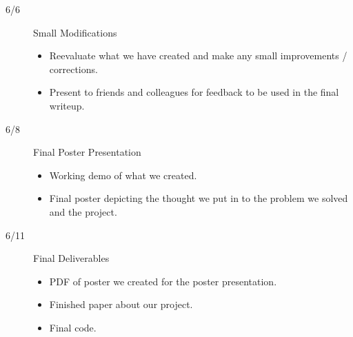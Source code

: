 \documentclass{article}
\begin{document}
\begin{description}
    \item[6/6] Small Modifications
    \begin{itemize}
        \item Reevaluate what we have created and make any small improvements / corrections.
        \item Present to friends and colleagues for feedback to be used in the final writeup.
    \end{itemize}

    \item[6/8] Final Poster Presentation
    \begin{itemize}
        \item Working demo of what we created.
        \item Final poster depicting the thought we put in to the problem we solved and the project.
    \end{itemize}

    \item[6/11] Final Deliverables
    \begin{itemize}
        \item PDF of poster we created for the poster presentation.
        \item Finished paper about our project.
        \item Final code.
    \end{itemize}
\end{description}



\end{document}

